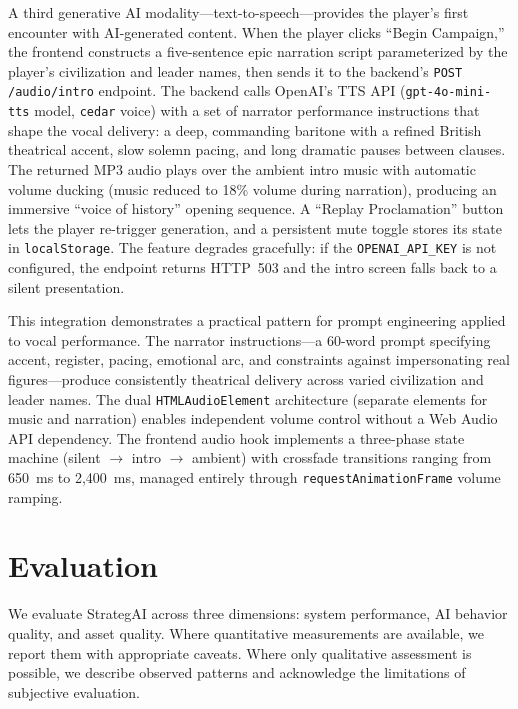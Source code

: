 \documentclass[conference]{IEEEtran}
\begin{document}
A third generative AI modality---text-to-speech---provides the player's
first encounter with AI-generated content. When the player clicks ``Begin
Campaign,'' the frontend constructs a five-sentence epic narration script
parameterized by the player's civilization and leader names, then sends it
to the backend's \texttt{POST /audio/intro} endpoint. The backend calls
OpenAI's TTS API (\texttt{gpt-4o-mini-tts} model, \texttt{cedar} voice)
with a set of narrator performance instructions that shape the vocal
delivery: a deep, commanding baritone with a refined British theatrical
accent, slow solemn pacing, and long dramatic pauses between clauses. The
returned MP3 audio plays over the ambient intro music with automatic volume
ducking (music reduced to 18\% volume during narration), producing an
immersive ``voice of history'' opening sequence. A ``Replay Proclamation''
button lets the player re-trigger generation, and a persistent mute toggle
stores its state in \texttt{localStorage}. The feature degrades gracefully:
if the \texttt{OPENAI\_API\_KEY} is not configured, the endpoint returns
HTTP~503 and the intro screen falls back to a silent presentation.

This integration demonstrates a practical pattern for prompt engineering
applied to vocal performance. The narrator instructions---a 60-word prompt
specifying accent, register, pacing, emotional arc, and constraints against
impersonating real figures---produce consistently theatrical delivery across
varied civilization and leader names. The dual \texttt{HTMLAudioElement}
architecture (separate elements for music and narration) enables
independent volume control without a Web Audio API dependency. The frontend
audio hook implements a three-phase state machine (silent $\rightarrow$
intro $\rightarrow$ ambient) with crossfade transitions ranging from
650~ms to 2,400~ms, managed entirely through \texttt{requestAnimationFrame}
volume ramping.

\FloatBarrier
\section{Evaluation}
\label{sec:evaluation}

We evaluate StrategAI across three dimensions: system performance, AI
behavior quality, and asset quality. Where quantitative measurements are
available, we report them with appropriate caveats. Where only qualitative
assessment is possible, we describe observed patterns and acknowledge the
limitations of subjective evaluation.
\end{document}
